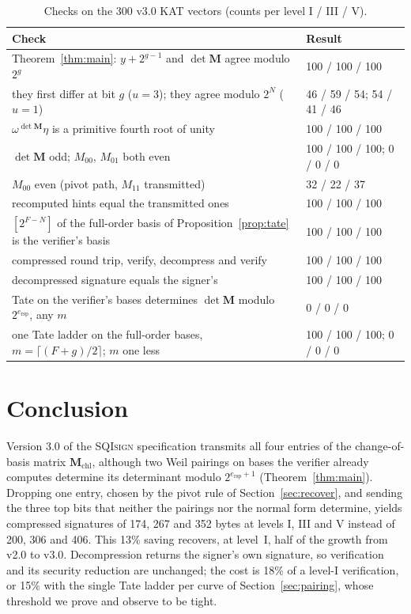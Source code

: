 \documentclass[version=submission]{iacrcc}
\newcommand{\ers}{e_{\mathrm{rsp}}}
\newcommand{\Mm}{\mathbf{M}}
\newcommand{\SQIsign}{{SQI}\textsc{sign}}
\begin{document}
\begin{table}[H]
\centering
\caption{Checks on the 300 v3.0 KAT vectors (counts per level I / III
/ V).}
\label{tab:checked}
\footnotesize
\begin{tabular}{p{8.6cm} l}
\toprule
\textbf{Check} & \textbf{Result} \\
\midrule
Theorem~\ref{thm:main}: $y + 2^{g - 1}$ and $\det \Mm$ agree modulo $2^g$ & 100 / 100 / 100 \\
\quad they first differ at bit $g$ ($u = 3$); they agree modulo $2^N$ ($u = 1$) & 46 / 59 / 54; 54 / 41 / 46 \\
$\omega^{\det \Mm} \eta$ is a primitive fourth root of unity & 100 / 100 / 100 \\
$\det \Mm$ odd; $M_{00}$, $M_{01}$ both even & 100 / 100 / 100; 0 / 0 / 0 \\
$M_{00}$ even (pivot path, $M_{11}$ transmitted) & 32 / 22 / 37 \\
recomputed hints equal the transmitted ones & 100 / 100 / 100 \\
$[2^{F - N}]$ of the full-order basis of Proposition~\ref{prop:tate} is the verifier's basis & 100 / 100 / 100 \\
compressed round trip, verify, decompress and verify & 100 / 100 / 100 \\
decompressed signature equals the signer's & 100 / 100 / 100 \\
Tate on the verifier's bases determines $\det \Mm$ modulo $2^{\ers}$, any $m$ & 0 / 0 / 0 \\
one Tate ladder on the full-order bases, $m = \lceil (F + g)/2 \rceil$; $m$ one less & 100 / 100 / 100; 0 / 0 / 0 \\
\bottomrule
\end{tabular}
\end{table}

\section{Conclusion}
\label{sec:conc}

Version 3.0 of the {\SQIsign} specification transmits all four entries of the
change-of-basis matrix $\Mm_{\mathrm{chl}}$, although two Weil pairings
on bases the verifier already computes determine its determinant modulo
$2^{\ers + 1}$ (Theorem~\ref{thm:main}). Dropping one entry, chosen by
the pivot rule of Section~\ref{sec:recover}, and sending the three top
bits that neither the pairings nor the normal form determine, yields
compressed signatures of 174, 267 and 352 bytes at levels I, III and V
instead of 200, 306 and 406. This 13\% saving recovers, at level~I, half
of the growth from v2.0 to v3.0. Decompression returns the
signer's own signature, so verification and its security reduction are
unchanged; the cost is 18\% of a level-I verification, or 15\% with the
single Tate ladder per curve of Section~\ref{sec:pairing}, whose
threshold we prove and observe to be tight.
\end{document}
